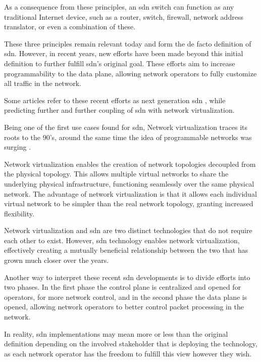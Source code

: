 As a consequence from these principles, an \gls{sdn} switch can function as any traditional Internet device, such as a router, switch, firewall, network address translator, or even a combination of these. 

These three principles remain relevant today and form the de facto definition of \gls{sdn}. However, in recent years, new efforts have been made beyond this initial definition to further fulfill \gls{sdn}'s original goal. These efforts aim to increase programmability to the data plane, allowing network operators to fully customize all traffic in the network.

Some articles refer to these recent efforts as next generation \gls{sdn} \cite{liatifis_advancing_2023}\cite{sofia_shaping_2024}, while predicting further and further coupling of \gls{sdn} with network virtualization.

Being one of the first use cases found for \gls{sdn}, Network virtualization traces its roots to the 90's, around the same time the idea of programmable networks was surging\cite{kreutz_software-defined_2015} \cite{feamster_road_2013}.  

Network virtualization enables the creation of network topologies decoupled from the physical topology. This allows multiple virtual networks to share the underlying physical infrastructure, functioning seamlessly over the same physical network\cite{thyagaturu_software_2016}.  The advantage of network virtualization is that it allows each individual virtual network to be simpler than the real network topology, granting increased flexibility. 

Network virtualization and \gls{sdn} are two distinct technologies that do not require each other to exist. However, \gls{sdn} technology enables network virtualization, effectively creating a mutually beneficial relationship between the two that has grown much closer over the years\cite{feamster_road_2013}.

Another way to interpret these recent \gls{sdn} developments is to divide efforts into two phases. In the first phase the control plane is centralized and opened for operators, for more network control, and in the second phase the data plane is opened, allowing network operators to better control packet processing in the network. 

In reality, \gls{sdn} implementations may mean more or less than the original definition depending on the involved stakeholder that is deploying the technology, as each network operator has the freedom to fulfill this view however they wish\cite{peterson_software-defined_2021}. 

